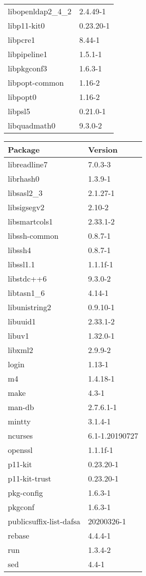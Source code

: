 \documentclass[11pt, english, openany]{report}
\begin{document}
\begin{appendices}
\begin{center}
\begin{tabular}{|m{3cm}|m{3cm}|}
libopenldap2\_4\_2 & 2.4.49-1 \\
libp11-kit0 & 0.23.20-1 \\
libpcre1 & 8.44-1 \\
libpipeline1 & 1.5.1-1 \\
libpkgconf3 & 1.6.3-1 \\
libpopt-common & 1.16-2 \\
libpopt0 & 1.16-2 \\
libpsl5 & 0.21.0-1 \\
libquadmath0 & 9.3.0-2 \\
\hline
\end{tabular}
\newpage
\begin{tabular}{|m{3cm}|m{3cm}|}
Package & Version \\
\hline
libreadline7 & 7.0.3-3 \\
librhash0 & 1.3.9-1 \\
libsasl2\_3 & 2.1.27-1 \\
libsigsegv2 & 2.10-2 \\
libsmartcols1 & 2.33.1-2 \\
libssh-common & 0.8.7-1 \\
libssh4 & 0.8.7-1 \\
libssl1.1 & 1.1.1f-1 \\
libstdc++6 & 9.3.0-2 \\
libtasn1\_6 & 4.14-1 \\
libunistring2 & 0.9.10-1 \\
libuuid1 & 2.33.1-2 \\
libuv1 & 1.32.0-1 \\
libxml2 & 2.9.9-2 \\
login & 1.13-1 \\
m4 & 1.4.18-1 \\
make & 4.3-1 \\
man-db & 2.7.6.1-1 \\
mintty & 3.1.4-1 \\
ncurses & 6.1-1.20190727 \\
openssl & 1.1.1f-1 \\
p11-kit & 0.23.20-1 \\
p11-kit-trust & 0.23.20-1 \\
pkg-config & 1.6.3-1 \\
pkgconf & 1.6.3-1 \\
publicsuffix-list-dafsa & 20200326-1 \\
rebase & 4.4.4-1 \\
run & 1.3.4-2 \\
sed & 4.4-1 \\

\end{tabular}
\end{center}
\end{appendices}
\end{document}
